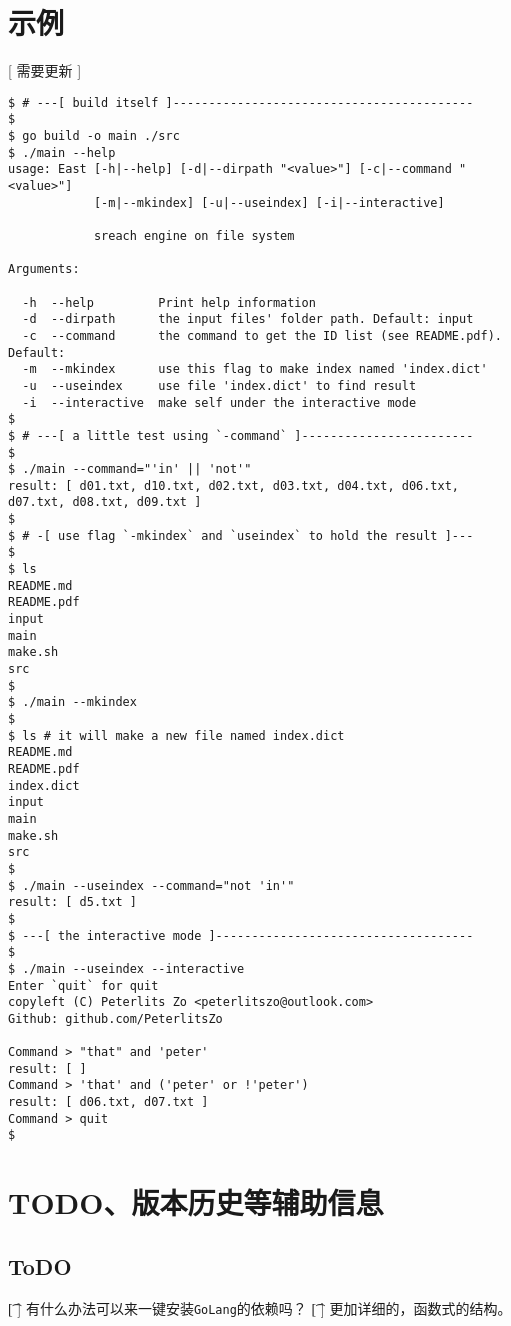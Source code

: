 \documentclass{peterlitsdoc}
\begin{document}

\section{示例}

[ 需要更新 ]

\begin{lstlisting}
$ # ---[ build itself ]------------------------------------------
$
$ go build -o main ./src
$ ./main --help
usage: East [-h|--help] [-d|--dirpath "<value>"] [-c|--command "<value>"]
            [-m|--mkindex] [-u|--useindex] [-i|--interactive]

            sreach engine on file system

Arguments:

  -h  --help         Print help information
  -d  --dirpath      the input files' folder path. Default: input
  -c  --command      the command to get the ID list (see README.pdf). Default: 
  -m  --mkindex      use this flag to make index named 'index.dict'
  -u  --useindex     use file 'index.dict' to find result
  -i  --interactive  make self under the interactive mode
$
$ # ---[ a little test using `-command` ]------------------------
$
$ ./main --command="'in' || 'not'"
result: [ d01.txt, d10.txt, d02.txt, d03.txt, d04.txt, d06.txt, d07.txt, d08.txt, d09.txt ]
$
$ # -[ use flag `-mkindex` and `useindex` to hold the result ]---
$
$ ls
README.md
README.pdf
input
main
make.sh
src
$
$ ./main --mkindex
$
$ ls # it will make a new file named index.dict
README.md
README.pdf
index.dict
input
main
make.sh
src
$
$ ./main --useindex --command="not 'in'"
result: [ d5.txt ]
$
$ ---[ the interactive mode ]------------------------------------
$
$ ./main --useindex --interactive
Enter `quit` for quit
copyleft (C) Peterlits Zo <peterlitszo@outlook.com>
Github: github.com/PeterlitsZo

Command > "that" and 'peter'
result: [ ]
Command > 'that' and ('peter' or !'peter')
result: [ d06.txt, d07.txt ]
Command > quit
$ 
\end{lstlisting}


\section{TODO、版本历史等辅助信息}

\subsection{ToDO}
\begin{plttodoenv}{1}
    \t[ ] 有什么办法可以来一键安装\verb|GoLang|的依赖吗？
    \t[ ]  更加详细的，函数式的结构。
\end{plttodoenv}
\end{document}
